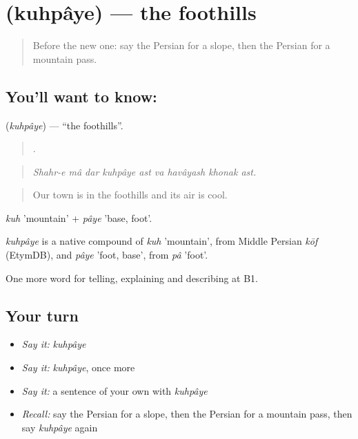 \section[\texorpdfstring{\fa{کوهپایه} (kuhpâye)}{کوهپایه (kuhpâye)}]{ (kuhpâye) — the foothills}

\label{lesson:FA-C468-kuhpaye}



\begin{quote}
Before the new one: say the Persian for a slope, then the Persian for a mountain pass.
\end{quote}

\subsection*{You'll want to know: }
\textbf{} (\emph{kuhpâye}) — \textquotedblleft{}the foothills\textquotedblright{}.

\begin{quote}
        .
\end{quote}

\begin{quote}
\emph{Shahr-e mâ dar kuhpâye ast va havâyash khonak ast.}
\end{quote}

\begin{quote}
Our town is in the foothills and its air is cool.
\end{quote}

\emph{kuh} 'mountain' + \emph{pâye} 'base, foot'.

\begin{cousinweb}
\emph{kuhpâye} is a native compound of \emph{kuh} 'mountain', from Middle Persian \emph{kōf} (EtymDB), and \emph{pâye} 'foot, base', from \emph{pâ} 'foot'.
\end{cousinweb}

\begin{grammarlens}[title={What you've built}]
One more word for telling, explaining and describing at B1.
\end{grammarlens}

\subsection*{Your turn}
\begin{itemize}
\raggedright
  \item \emph{Say it:} \emph{kuhpâye}
  \item \emph{Say it:} \emph{kuhpâye}, once more
  \item \emph{Say it:} a sentence of your own with \emph{kuhpâye}
  \item \emph{Recall:} say the Persian for a slope, then the Persian for a mountain pass, then say \emph{kuhpâye} again
\end{itemize}

